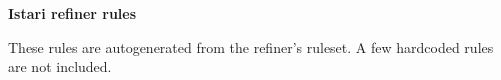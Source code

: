 \documentclass[11pt]{article}
\begin{document}
\begin{center}
{\Large\bf Istari refiner rules}
\end{center}

These rules are autogenerated from the refiner's ruleset.  A few
hardcoded rules are not included.


\end{document}
